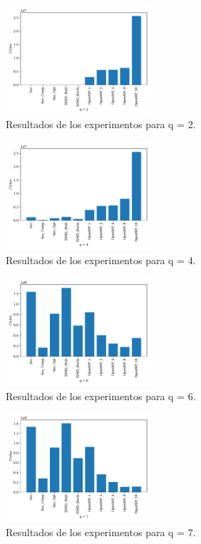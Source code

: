 \documentclass[conference]{IEEEtran}
\begin{document}
\begin{figure}[htbp]
    \centering
        \includegraphics[width=0.48\textwidth]{graficaBarrasTandas356_2.pdf}
        \caption{Resultados de los experimentos para q = 2.}
        \label{graficaq2}
\end{figure}

\begin{figure}[htbp]
    \centering
        \includegraphics[width=0.48\textwidth]{graficaBarrasTandas356_4.pdf}
        \caption{Resultados de los experimentos para q = 4.}
        \label{graficaq4}
\end{figure}

\begin{figure}[htbp]
    \centering
        \includegraphics[width=0.48\textwidth]{graficaBarrasTandas356_6.pdf}
        \caption{Resultados de los experimentos para q = 6.}
        \label{graficaq6}
\end{figure}

\begin{figure}[htbp]
    \centering
        \includegraphics[width=0.48\textwidth]{graficaBarrasTandas356_7.pdf}
        \caption{Resultados de los experimentos para q = 7.}
        \label{graficaq7}
\end{figure}
\end{document}
